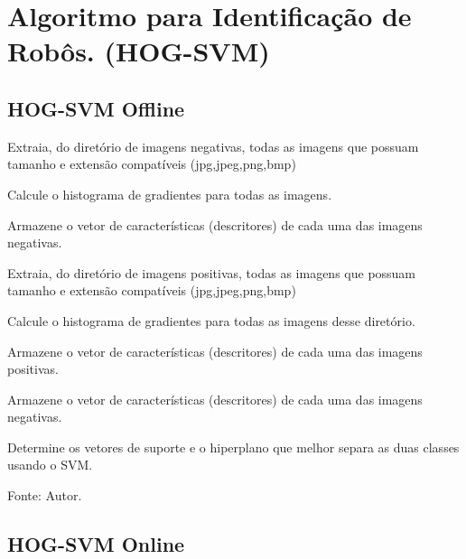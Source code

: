 \chapter{Algoritmo para Identificação de Robôs. (HOG-SVM)} \label{chap:apendiceHOG}

\section{HOG-SVM Offline}
\begin{algorithm}



Extraia, do diretório de imagens negativas, todas as imagens que possuam tamanho e extensão compatíveis (jpg,jpeg,png,bmp)

Calcule o histograma de gradientes para todas as imagens.

Armazene o vetor de características (descritores) de cada uma das imagens negativas.

Extraia, do diretório de imagens positivas, todas as imagens que possuam tamanho e extensão compatíveis (jpg,jpeg,png,bmp)

Calcule o histograma de gradientes para todas as imagens desse diretório.

Armazene o vetor de características (descritores) de cada uma das imagens positivas.

Armazene o vetor de características (descritores) de cada uma das imagens negativas.


Determine os vetores de suporte e o hiperplano que melhor separa as duas classes usando o SVM.


\label{lst:algROF}
\caption[Algoritmo para Identificação de Robôs. (HOG-SVM Offline)]{Fonte: Autor.}
\end{algorithm}

\pagebreak

\section{HOG-SVM Online}

